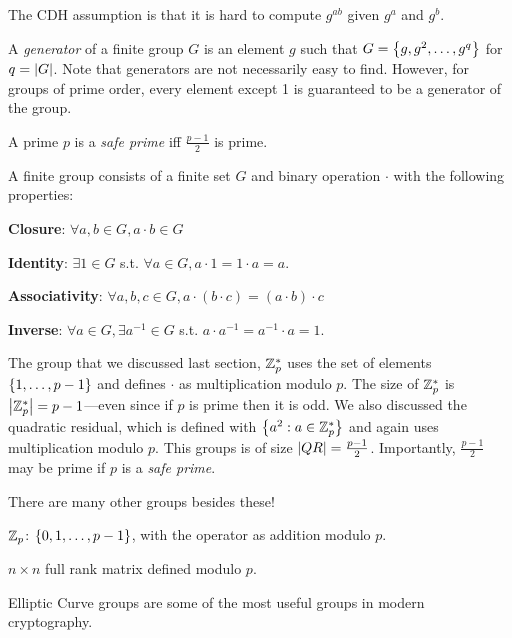 The CDH assumption is that it is hard to compute $g^{ab}$ given $g^a$ and $g^b$.

\begin{definition}
	A \emph{generator} of a finite group $G$ is an element $g$ such that $G = \left\{ g, g^2, \ldots, g^q \right\}$ for $q = \left| G \right|$. Note that generators are not necessarily easy to find. However, for groups of prime order, every element except 1 is guaranteed to be a generator of the group.
\end{definition}

\begin{definition}
	A prime $p$ is a \emph{safe prime} iff $\tfrac{p-1}{2}$ is prime.
\end{definition}

\begin{definition}
	A finite group consists of a finite set $G$ and binary operation $\cdot$ with the following properties:
	\begin{compactenum}
		\item \textbf{Closure}: $\forall a, b \in G, a \cdot b \in G$
		\item \textbf{Identity}: $\exists 1 \in G$  s.t. $\forall a \in G, a\cdot 1 = 1\cdot a = a$.
		\item \textbf{Associativity}: $\forall a, b, c \in G, a\cdot (b \cdot c) = (a \cdot b) \cdot c$
		\item \textbf{Inverse}: $\forall a \in G, \exists a^{-1} \in G$ s.t. $a\cdot a^{-1} = a^{-1}\cdot a = 1$.
	\end{compactenum}
\end{definition}

The group that we discussed last section, $\mathbb{Z}_p^*$ uses the set of elements $\left\{ 1, \ldots, p-1 \right\}$ and defines $\cdot$ as multiplication modulo $p$. The size of $\mathbb{Z}_p^*$ is $\left| \mathbb{Z}_p^* \right| = p-1$---even since if $p$ is prime then it is odd. We also discussed the quadratic residual, which is defined with $\left\{ a^2: a \in \mathbb{Z}_p^* \right\}$ and again uses multiplication modulo $p$. This groups is of size $\left| QR \right| = \tfrac{p-1}{2}$. Importantly, $\tfrac{p-1}{2}$ may be prime if $p$ is a \emph{safe prime}.

There are many other groups besides these!
\begin{compactitem}
\item $\mathbb{Z}_p$: $\left\{ 0, 1, \ldots, p-1 \right\}$, with the operator as addition modulo $p$.
\item $n \times n$ full rank matrix defined modulo $p$.
\item Elliptic Curve groups are some of the most useful groups in modern cryptography.
\end{compactitem}
\fi

